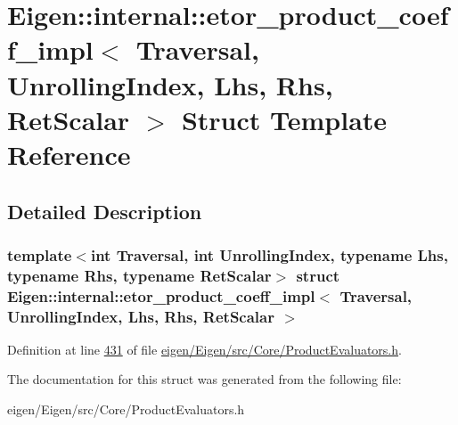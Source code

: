 \hypertarget{struct_eigen_1_1internal_1_1etor__product__coeff__impl}{}\section{Eigen\+:\+:internal\+:\+:etor\+\_\+product\+\_\+coeff\+\_\+impl$<$ Traversal, Unrolling\+Index, Lhs, Rhs, Ret\+Scalar $>$ Struct Template Reference}
\label{struct_eigen_1_1internal_1_1etor__product__coeff__impl}


\subsection{Detailed Description}
\subsubsection*{template$<$int Traversal, int Unrolling\+Index, typename Lhs, typename Rhs, typename Ret\+Scalar$>$\newline
struct Eigen\+::internal\+::etor\+\_\+product\+\_\+coeff\+\_\+impl$<$ Traversal, Unrolling\+Index, Lhs, Rhs, Ret\+Scalar $>$}



Definition at line \hyperlink{eigen_2_eigen_2src_2_core_2_product_evaluators_8h_source_l00431}{431} of file \hyperlink{eigen_2_eigen_2src_2_core_2_product_evaluators_8h_source}{eigen/\+Eigen/src/\+Core/\+Product\+Evaluators.\+h}.



The documentation for this struct was generated from the following file\+:\begin{DoxyCompactItemize}
\item 
eigen/\+Eigen/src/\+Core/\+Product\+Evaluators.\+h\end{DoxyCompactItemize}
